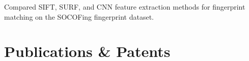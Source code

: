 \documentclass[]{deedy-resume-openfont}
\begin{document}
\begin{minipage}[t]{0.70\textwidth}
\begin{tightemize}
\item Compared SIFT, SURF, and CNN feature extraction methods for fingerprint matching on the SOCOFing fingerprint dataset.
\end{tightemize}
\sectionsep






\section{Publications \& Patents} 


\nocite{*}


\end{minipage}
\end{document}
